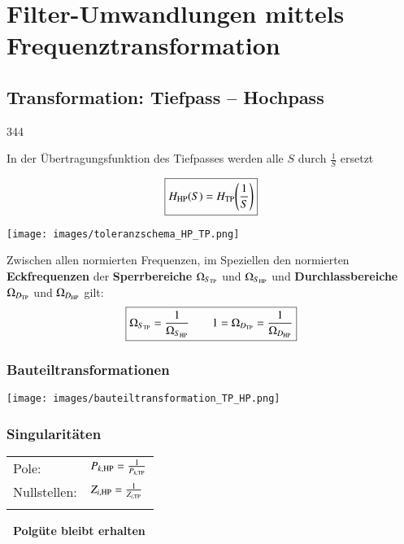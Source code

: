 
\section{Filter-Umwandlungen mittels Frequenztransformation}
\label{Frequenztransformation}

\subsection{Transformation: Tiefpass -- Hochpass}{344}

In der Übertragungsfunktion des Tiefpasses werden alle $S$ durch $\frac{1}{S}$ ersetzt

\begin{minipage}[c]{0.4\columnwidth}
    $$ \boxed{H_{\rm HP}(S) = H_{\rm TP} \Bigg(\frac{1}{S} \Bigg) } $$
\end{minipage}
\hfill
\begin{minipage}[c]{0.58\columnwidth}
    \texttt{[image: images/toleranzschema\_HP\_TP.png]}
\end{minipage}

\vspace{0.2cm}
Zwischen allen normierten Frequenzen, im Speziellen den normierten \textbf{Eckfrequenzen} der \textbf{Sperrbereiche}
$\Omega_{S_{\rm TP}}$ und $\Omega_{S_{\rm HP}}$ und \textbf{Durchlassbereiche} $\Omega_{D_{\rm TP}}$ und $\Omega_{D_{\rm HP}}$ gilt:
$$ \boxed{ \Omega_{S_{\rm TP}} = \frac{1}{\Omega_{S_{\rm HP}}}  \qquad 1 = \Omega_{D_{\rm TP}} = \frac{1}{\Omega_{D_{\rm HP}}} } $$


\begin{minipage}[t]{0.48\columnwidth}
    \subsubsection{Bauteiltransformationen}

    \texttt{[image: images/bauteiltransformation\_TP\_HP.png]}
\end{minipage}
\hfill
\begin{minipage}[t]{0.48\columnwidth}
    \subsubsection{Singularitäten}

    \begin{tabular}{ll}
        Pole:           & $P_{k, \rm HP} = \frac{1}{P_{k, \rm TP}}$ \\
        Nullstellen:    & $Z_{i, \rm HP} = \frac{1}{Z_{i, \rm TP}}$ \\
        \\
    \end{tabular}

    \textbf{\textrightarrow\ Polgüte bleibt erhalten}
\end{minipage}


